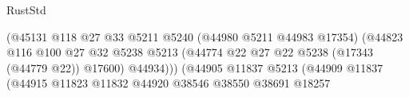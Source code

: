 \begin{lexlean}{RustStd}
\begin{coremodule}
                                                                (@45131
                                                                  @118
                                                                  @27
                                                                  @33
                                                                  @5211
                                                                  @5240
                                                                  (@44980 @5211 @44983 @17354)
                                                                  (@44823
                                                                    @116
                                                                    @100
                                                                    @27
                                                                    @32
                                                                    @5238
                                                                    @5213
                                                                    (@44774
                                                                      @22
                                                                      @27
                                                                      @22
                                                                      @5238
                                                                      (@17343 (@44779 @22))
                                                                      @17600)
                                                                    @44934)))
                                                              (@44905
                                                                @11837
                                                                @5213
                                                                (@44909
                                                                  @11837
                                                                  (@44915
                                                                    @11823
                                                                    @11832
                                                                    @44920
                                                                    @38546
                                                                    @38550
                                                                    @38691
                                                                    @18257

\end{coremodule}
\end{lexlean}
